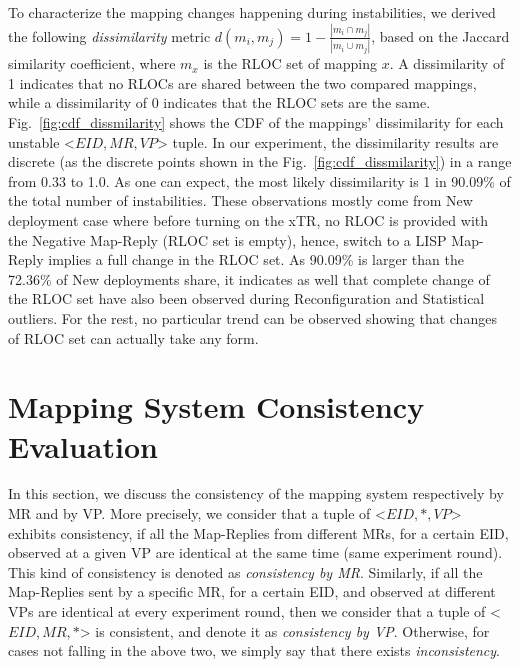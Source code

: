 To characterize the mapping changes happening during instabilities, we derived the following \emph{dissimilarity} metric $d(m_i,m_j) = 1 - \frac{ \left|m_i \cap m_j\right|}{\left|m_i \cup m_j\right|}$, based on the Jaccard similarity coefficient, where $m_x$ is the RLOC set of mapping $x$. A dissimilarity of 1 indicates that no RLOCs are shared between the two compared mappings, while a dissimilarity of 0 indicates that the RLOC sets are the same. Fig.~\ref{fig:cdf_dissmilarity} shows the CDF of the mappings' dissimilarity for each unstable <$EID, MR, VP$> tuple. In our experiment, the dissimilarity results are discrete (as the discrete points shown in the Fig.~\ref{fig:cdf_dissmilarity}) in a range from 0.33 to 1.0. As one can expect, the most likely dissimilarity is 1 in 90.09\% of the total number of instabilities. These observations mostly come from New deployment case where before turning on the xTR, no RLOC is provided with the Negative Map-Reply (RLOC set is empty), hence, switch to a LISP Map-Reply implies a full change in the RLOC set. As 90.09\% is larger than the 72.36\% of New deployments share, it indicates as well that complete change of the RLOC set have also been observed during Reconfiguration and Statistical outliers. For the rest, no particular trend can be observed showing that changes of RLOC set can actually take any form.


\section{Mapping System Consistency Evaluation}
\label{sec:mds_consistency}

In this section, we discuss the consistency of the mapping system respectively by MR and by VP. More precisely, we consider that a tuple of <$EID, *, VP$> exhibits consistency, if all the Map-Replies from different MRs, for a certain EID, observed at a given VP are identical at the same time (same experiment round). This kind of consistency is denoted as \emph{consistency by MR}. Similarly, if all the Map-Replies sent by a specific MR, for a certain EID, and observed at different VPs are identical at every experiment round, then we consider that a tuple of <$EID, MR, * $> is consistent, and denote it as \emph{consistency by VP}. Otherwise, for cases not falling in the above two, we simply say that there exists \emph{inconsistency}. 

